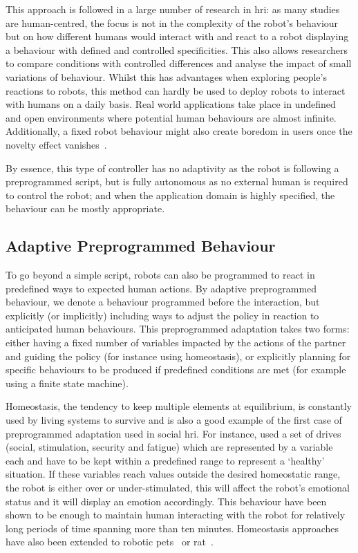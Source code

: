 This approach is followed in a large number of research in \gls{hri}: as many studies are human-centred, the focus is not in the complexity of the robot's behaviour but on how different humans would interact with and react to a robot displaying a behaviour with defined and controlled specificities. This also allows researchers to compare conditions with controlled differences and analyse the impact of small variations of behaviour. Whilst this has advantages when exploring people's reactions to robots, this method can hardly be used to deploy robots to interact with humans on a daily basis. Real world applications take place in undefined and open environments where potential human behaviours are almost infinite. Additionally, a fixed robot behaviour might also create boredom in users once the novelty effect vanishes~\citep{salter2004robots}.

By essence, this type of controller has no adaptivity as the robot is following a preprogrammed script, but is fully autonomous as no external human is required to control the robot; and when the application domain is highly specified, the behaviour can be mostly appropriate.

\subsection{Adaptive Preprogrammed Behaviour}

To go beyond a simple script, robots can also be programmed to react in predefined ways to expected human actions. By adaptive preprogrammed behaviour, we denote a behaviour programmed before the interaction, but explicitly (or implicitly) including ways to adjust the policy in reaction to anticipated human behaviours. This preprogrammed adaptation takes two forms: either having a fixed number of variables impacted by the actions of the partner and guiding the policy (for instance using homeostasis), or explicitly planning for specific behaviours to be produced if predefined conditions are met (for example using a finite state machine).

Homeostasis, the tendency to keep multiple elements at equilibrium, is constantly used by living systems to survive and is also a good example of the first case of preprogrammed adaptation used in social \gls{hri}. For instance, \citet{breazeal1998motivational} used a set of drives (social, stimulation, security and fatigue) which are represented by a variable each and have to be kept within a predefined range to represent a `healthy' situation. If these variables reach values outside the desired homeostatic range, the robot is either over or under-stimulated, this will affect the robot's emotional status and it will display an emotion accordingly. This behaviour have been shown to be enough to maintain human interacting with the robot for relatively long periods of time spanning more than ten minutes. Homeostasis approaches have also been extended to robotic pets~\citep{arkin2003ethological} or \gls{rat}~\citep{cao2017collaborative}.

